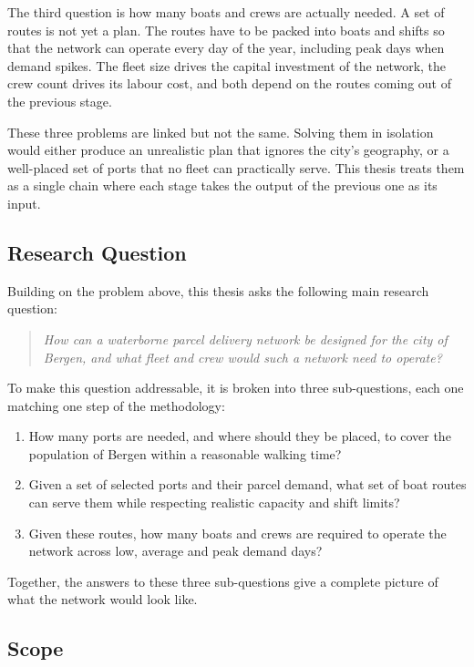 \documentclass[12pt]{article}
\begin{document}
The third question is how many boats and crews are actually needed. A set of routes is not yet a plan. The routes have to be packed into boats and shifts so that the network can operate every day of the year, including peak days when demand spikes. The fleet size drives the capital investment of the network, the crew count drives its labour cost, and both depend on the routes coming out of the previous stage.

These three problems are linked but not the same. Solving them in isolation would either produce an unrealistic plan that ignores the city's geography, or a well-placed set of ports that no fleet can practically serve. This thesis treats them as a single chain where each stage takes the output of the previous one as its input.

\subsection{Research Question}
\label{subsec:research-question}

Building on the problem above, this thesis asks the following main research question:

\begin{quote}
  \textit{How can a waterborne parcel delivery network be designed for the city of Bergen, and what fleet and crew would such a network need to operate?}
\end{quote}

To make this question addressable, it is broken into three sub-questions, each one matching one step of the methodology:

\begin{enumerate}
  \item How many ports are needed, and where should they be placed, to cover the population of Bergen within a reasonable walking time?
  \item Given a set of selected ports and their parcel demand, what set of boat routes can serve them while respecting realistic capacity and shift limits?
  \item Given these routes, how many boats and crews are required to operate the network across low, average and peak demand days?
\end{enumerate}

Together, the answers to these three sub-questions give a complete picture of what the network would look like.

\subsection{Scope}
\label{subsec:scope}
\end{document}
